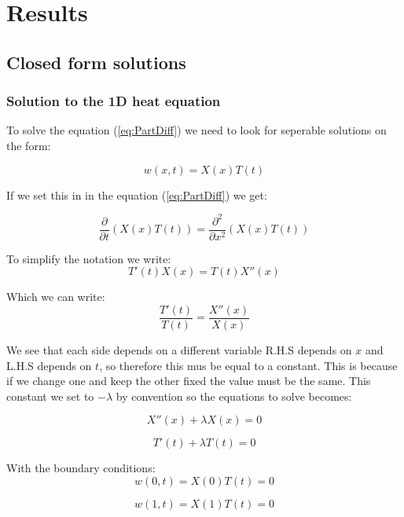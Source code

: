\documentclass[a4paper,10pt]{article}
\begin{document}
\section{Results}
\subsection{Closed form solutions}
\subsubsection{Solution to the 1D heat equation}
To solve the equation (\ref{eq:PartDiff}) we need to look for seperable solutions on the form:

\begin{equation}
 w(x,t) = X(x)T(t)
 \label{eq:u_xt}
\end{equation}

If we set this in in the equation (\ref{eq:PartDiff}) we get:

\begin{equation}
  \frac{\partial }{\partial t}(X(x)T(t)) = \frac{\partial ^2}{\partial x^2}(X(x)T(t))
\end{equation}

To simplify the notation we write:
\begin{equation}
 T'(t)X(x) = T(t)X''(x)
\end{equation}

Which we can write:
\begin{equation}
 \frac{T'(t)}{T(t)} = \frac{X''(x)}{X(x)}
\end{equation}

We see that each side depends on a different variable R.H.S depends on $x$ and L.H.S depends on $t$, so therefore this mus be equal to a constant.
This is because if we change one and keep the other fixed the value must be the same. This constant we set to $-\lambda$ by convention so the equations
to solve becomes:

\begin{equation}
 X''(x) + \lambda X(x) = 0
\end{equation}

\begin{equation}
 T'(t) + \lambda T(t) = 0
\end{equation}

With the boundary conditions:
\begin{equation}
 w(0,t) = X(0)T(t) = 0
\end{equation}

\begin{equation}
 w(1,t) = X(1)T(t) = 0
\end{equation}
\end{document}
